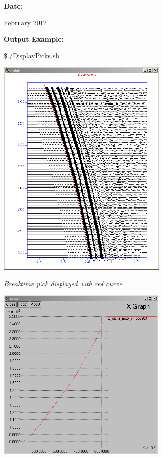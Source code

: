 \documentclass{article}
\begin{document}
\vspace{4pt}
\leftskip=0pt
\textbf{Date:}

\vspace{4pt}
\leftskip=18pt
February 2012 

\vspace{16pt}
\leftskip=0pt
\textbf{Output Example:\pagebreak{}}

\vspace{4pt}
\$./DisplayPicks.sh

\vspace{4pt}
\begin{center}
\includegraphics[width=239pt, height=311pt, keepaspectratio=true]{LatihanVSPsu-fig003.png}

\vspace{16pt}
\textit{Breaktime pick displayed with red curve}

\vspace{16pt}
\includegraphics[width=237pt, height=245pt, keepaspectratio=true]{LatihanVSPsu-fig004.png}


\end{center}
\end{document}
